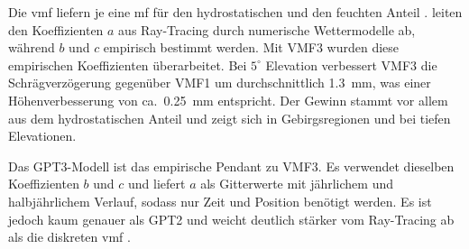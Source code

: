 Die \gls{vmf} liefern je eine \gls{mf} für den hydrostatischen und den feuchten Anteil \parencite[S. 42-44]{aichinger-rosenbergerTroposphericDelayParameters2021}.
\citeauthor{landskronVMF3GPT3Refined2018} leiten den Koeffizienten $a$ aus Ray-Tracing durch numerische Wettermodelle ab, während $b$ und $c$ empirisch bestimmt werden.
Mit VMF3 wurden diese empirischen Koeffizienten überarbeitet. Bei $5^\circ$ Elevation verbessert VMF3 die Schrägverzögerung gegenüber VMF1 um 
durchschnittlich \SI{1.3}{\milli\metre}, was einer Höhenverbesserung von ca.\ \SI{0.25}{\milli\metre} entspricht.
Der Gewinn stammt vor allem aus dem hydrostatischen Anteil und zeigt sich in Gebirgsregionen und bei tiefen Elevationen. \parencite{landskronVMF3GPT3Refined2018}

Das GPT3-Modell ist das empirische Pendant zu VMF3.
Es verwendet dieselben Koeffizienten $b$ und $c$ und liefert $a$ als Gitterwerte mit jährlichem und halbjährlichem Verlauf,
sodass nur Zeit und Position benötigt werden.
Es ist jedoch kaum genauer als GPT2 \parencite{laglerGPT2EmpiricalSlant2013}
und weicht deutlich stärker vom Ray-Tracing ab als die diskreten \gls{vmf} \parencite{landskronVMF3GPT3Refined2018}.